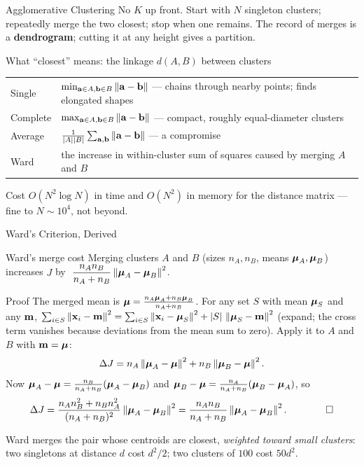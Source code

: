 \documentclass[11pt,aspectratio=169]{beamer}
\begin{document}

\begin{frame}{Agglomerative Clustering}
No $K$ up front. Start with $N$ singleton clusters; repeatedly merge the two closest; stop when one remains.
The record of merges is a \textbf{dendrogram}; cutting it at any height gives a partition.
\begin{block}{What ``closest'' means: the linkage $d(A,B)$ between clusters}
\begin{center}
\begin{tabular}{ll}
\toprule
Single & $\min_{\mathbf{a}\in A,\mathbf{b}\in B}\left\lVert \mathbf{a}-\mathbf{b} \right\rVert$ --- chains through nearby points; finds elongated shapes \\
Complete & $\max_{\mathbf{a}\in A,\mathbf{b}\in B}\left\lVert \mathbf{a}-\mathbf{b} \right\rVert$ --- compact, roughly equal-diameter clusters \\
Average & $\frac{1}{|A||B|}\sum_{\mathbf{a},\mathbf{b}}\left\lVert \mathbf{a}-\mathbf{b} \right\rVert$ --- a compromise \\
Ward & the increase in within-cluster sum of squares caused by merging $A$ and $B$ \\
\bottomrule
\end{tabular}
\end{center}
\end{block}
Cost $O(N^2\log N)$ in time and $O(N^2)$ in memory for the distance matrix --- fine to $N\sim10^4$, not beyond.
\end{frame}

\begin{frame}{Ward's Criterion, Derived}\footnotesize
\begin{claim}{Ward's merge cost}
Merging clusters $A$ and $B$ (sizes $n_A,n_B$, means $\boldsymbol{\mu}_A,\boldsymbol{\mu}_B$) increases $J$ by
$\ \dfrac{n_An_B}{n_A+n_B}\norm{\vmu_A-\vmu_B}^2$.
\end{claim}
\begin{derivation}{Proof}
The merged mean is $\boldsymbol{\mu}=\frac{n_A\boldsymbol{\mu}_A+n_B\boldsymbol{\mu}_B}{n_A+n_B}$. For any set $S$ with mean $\boldsymbol{\mu}_S$ and any $\mathbf{m}$,
$\sum_{i\in S}\left\lVert \mathbf{x}_i-\mathbf{m} \right\rVert^2=\sum_{i\in S}\left\lVert \mathbf{x}_i-\boldsymbol{\mu}_S \right\rVert^2+|S|\,\left\lVert \boldsymbol{\mu}_S-\mathbf{m} \right\rVert^2$ (expand; the cross term
vanishes because deviations from the mean sum to zero). Apply it to $A$ and $B$ with $\mathbf{m}=\boldsymbol{\mu}$:
\[
\Delta J=n_A\left\lVert \boldsymbol{\mu}_A-\boldsymbol{\mu} \right\rVert^2+n_B\left\lVert \boldsymbol{\mu}_B-\boldsymbol{\mu} \right\rVert^2 .
\]
Now $\boldsymbol{\mu}_A-\boldsymbol{\mu}=\frac{n_B}{n_A+n_B}(\boldsymbol{\mu}_A-\boldsymbol{\mu}_B)$ and $\boldsymbol{\mu}_B-\boldsymbol{\mu}=\frac{n_A}{n_A+n_B}(\boldsymbol{\mu}_B-\boldsymbol{\mu}_A)$, so
\[
\Delta J=\frac{n_An_B^2+n_Bn_A^2}{(n_A+n_B)^2}\left\lVert \boldsymbol{\mu}_A-\boldsymbol{\mu}_B \right\rVert^2=\frac{n_An_B}{n_A+n_B}\left\lVert \boldsymbol{\mu}_A-\boldsymbol{\mu}_B \right\rVert^2 .\qquad\qed
\]
\end{derivation}
Ward merges the pair whose centroids are closest, \emph{weighted toward small clusters}: two singletons at distance $d$ cost $d^2/2$; two clusters of $100$ cost $50d^2$.
\end{frame}
\end{document}
